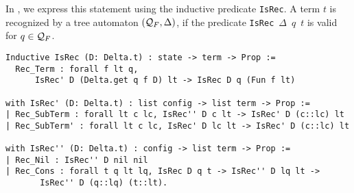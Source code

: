 In \coq, we express this statement using the inductive predicate
\lstinline!IsRec!. A term $t$ is recognized by a tree automaton $(\mathcal{Q}_F,
\Delta)$, if the predicate {\tt IsRec}~$\Delta$~$q$~$t$ is valid for $q \in
\mathcal{Q}_F$.

\begin{lstlisting}
Inductive IsRec (D: Delta.t) : state -> term -> Prop :=
  Rec_Term : forall f lt q,
      IsRec' D (Delta.get q f D) lt -> IsRec D q (Fun f lt)

with IsRec' (D: Delta.t) : list config -> list term -> Prop :=
| Rec_SubTerm : forall lt c lc, IsRec'' D c lt -> IsRec' D (c::lc) lt
| Rec_SubTerm' : forall lt c lc, IsRec' D lc lt -> IsRec' D (c::lc) lt
     
with IsRec'' (D: Delta.t) : config -> list term -> Prop :=
| Rec_Nil : IsRec'' D nil nil
| Rec_Cons : forall t q lt lq, IsRec D q t -> IsRec'' D lq lt ->
       IsRec'' D (q::lq) (t::lt).
\end{lstlisting}

